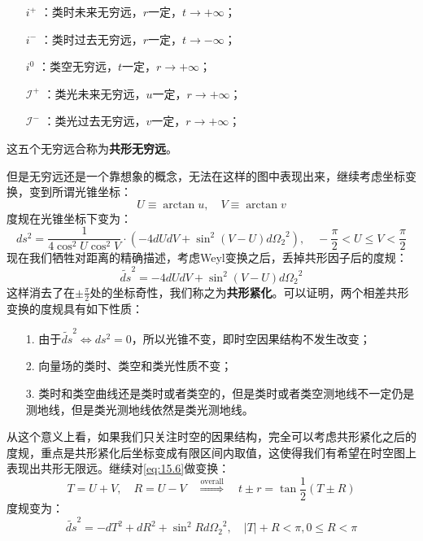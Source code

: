 \begin{itemize}
	\item[$i^+$]：类时未来无穷远，$r$一定，$t\to+\infty$；
	\item[$i^-$]：类时过去无穷远，$r$一定，$t\to-\infty$；
	\item[$i^0$]：类空无穷远，$t$一定，$r\to+\infty$；
	\item[$\mathcal{I}^+$]：类光未来无穷远，$u$一定，$r\to+\infty$；
	\item[$\mathcal{I}^-$]：类光过去无穷远，$v$一定，$r\to+\infty$；
\end{itemize}
这五个无穷远合称为\textbf{共形无穷远}。

但是无穷远还是一个靠想象的概念，无法在这样的图中表现出来，继续考虑坐标变换，变到所谓光锥坐标：
\begin{equation}
	U\equiv\arctan u ,\quad V\equiv\arctan v
\end{equation}
度规在光锥坐标下变为：
\begin{equation}
	ds^2=\frac{1}{4\cos^2U\cos^2V}\cdot\left(-4dUdV+\sin^2(V-U)d{\Omega_2}^2\right),\quad -\frac{\pi}{2}<U\leq V<\frac{\pi}{2}
\end{equation}
现在我们牺牲对距离的精确描述，考虑Weyl变换之后，丢掉共形因子后的度规：
\begin{equation}\label{eq:15.6}
	\tilde{ds}^2=-4dUdV+\sin^2(V-U)d{\Omega_2}^2
\end{equation}
这样消去了在$\pm\frac{\pi}{2}$处的坐标奇性，我们称之为\textbf{共形紧化}。可以证明\cite{blau}，两个相差共形变换的度规具有如下性质：
\begin{itemize}
	\item[1.] 由于$\tilde{ds}^2\iff ds^2=0$，所以光锥不变，即时空因果结构不发生改变；
	\item[2.] 向量场的类时、类空和类光性质不变；
	\item[3.] 类时和类空曲线还是类时或者类空的，但是类时或者类空测地线不一定仍是测地线，但是类光测地线依然是类光测地线。
\end{itemize}
从这个意义上看，如果我们只关注时空的因果结构，完全可以考虑共形紧化之后的度规，重点是共形紧化后坐标变成有限区间内取值，这使得我们有希望在时空图上表现出共形无限远。继续对\ref{eq:15.6}做变换：
\begin{equation}
	T=U+V,\quad R=U-V\quad\stackrel{\text{overall}}{\Longrightarrow}\quad t\pm r=\tan\frac{1}{2}\left(T\pm R\right)
\end{equation}
度规变为：
\begin{equation}
	\tilde{ds}^2=-dT^2+dR^2+\sin^2Rd{\Omega_2}^2,\quad|T|+R<\pi,0\leq R<\pi
\end{equation}
